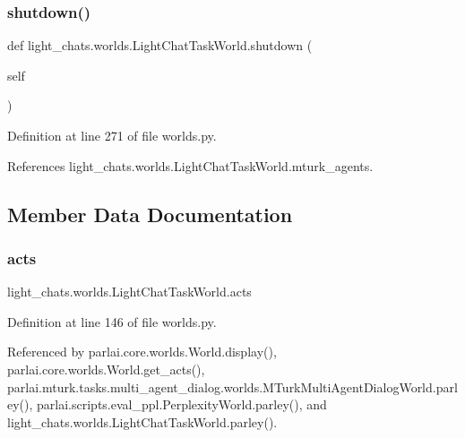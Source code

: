 \subsubsection{\texorpdfstring{shutdown()}{shutdown()}}
{\footnotesize\ttfamily def light\+\_\+chats.\+worlds.\+Light\+Chat\+Task\+World.\+shutdown (\begin{DoxyParamCaption}\item[{}]{self }\end{DoxyParamCaption})}



Definition at line 271 of file worlds.\+py.



References light\+\_\+chats.\+worlds.\+Light\+Chat\+Task\+World.\+mturk\+\_\+agents.



\subsection{Member Data Documentation}
\mbox{\label{classlight__chats_1_1worlds_1_1LightChatTaskWorld_a2b2a14119080a436033495c597b6bbbf}} 
\subsubsection{\texorpdfstring{acts}{acts}}
{\footnotesize\ttfamily light\+\_\+chats.\+worlds.\+Light\+Chat\+Task\+World.\+acts}



Definition at line 146 of file worlds.\+py.



Referenced by parlai.\+core.\+worlds.\+World.\+display(), parlai.\+core.\+worlds.\+World.\+get\+\_\+acts(), parlai.\+mturk.\+tasks.\+multi\+\_\+agent\+\_\+dialog.\+worlds.\+M\+Turk\+Multi\+Agent\+Dialog\+World.\+parley(), parlai.\+scripts.\+eval\+\_\+ppl.\+Perplexity\+World.\+parley(), and light\+\_\+chats.\+worlds.\+Light\+Chat\+Task\+World.\+parley().

\mbox{\label{classlight__chats_1_1worlds_1_1LightChatTaskWorld_ac0cf8e94d06f13b16c56ba58fbc2cf16}} 
